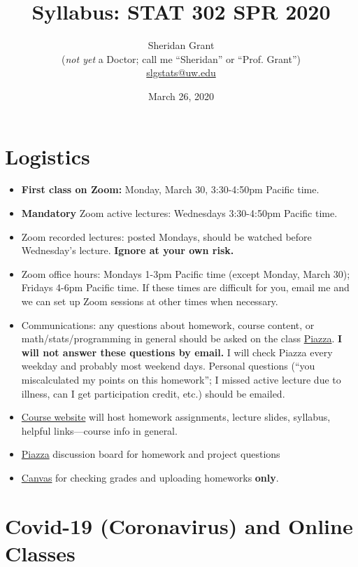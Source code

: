 \documentclass[12pt]{article}
\title{Syllabus: STAT 302 SPR 2020}
\author{Sheridan Grant\\(\textit{not yet} a Doctor; call me ``Sheridan'' or ``Prof. Grant'')\\\href{mailto:slgstats@uw.edu}{slgstats@uw.edu}}
\date{March 26, 2020}
\begin{document}
\sloppy

\maketitle

\section*{Logistics}

\begin{itemize}
	\item \textbf{First class on Zoom:} Monday, March 30, 3:30-4:50pm Pacific time.
	\item \textbf{Mandatory} Zoom active lectures: Wednesdays 3:30-4:50pm Pacific time.
	\item Zoom recorded lectures: posted Mondays, should be watched before Wednesday's lecture. \textbf{Ignore at your own risk.}
	\item Zoom office hours: Mondays 1-3pm Pacific time (except Monday, March 30); Fridays 4-6pm Pacific time. If these times are difficult for you, email me and we can set up Zoom sessions at other times when necessary.
	\item Communications: any questions about homework, course content, or math/stats/programming in general should be asked on the class \href{https://piazza.com/washington/spring2020/stat302}{Piazza}. \textbf{I will not answer these questions by email.} I will check Piazza every weekday and probably most weekend days. Personal questions (``you miscalculated my points on this homework''; I missed active lecture due to illness, can I get participation credit, etc.) should be emailed.
	\item \href{https://sheridanlgrant.github.io/teaching/STAT302_SPR2020}{Course website} will host homework assignments, lecture slides, syllabus, helpful links---course info in general.
	\item \href{https://piazza.com/washington/spring2020/stat302}{Piazza} discussion board for homework and project questions
	\item \href{https://canvas.uw.edu/}{Canvas} for checking grades and uploading homeworks \textbf{only}.
\end{itemize}

\section*{Covid-19 (Coronavirus) and Online Classes}
\end{document}
